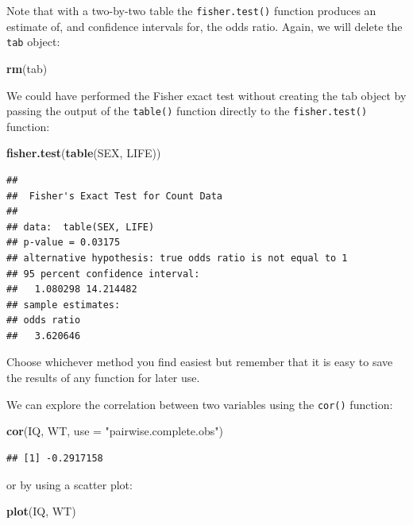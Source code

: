 \documentclass[]{book}
\newenvironment{Shaded}{\begin{snugshade}}{\end{snugshade}}
\newcommand{\KeywordTok}[1]{\textcolor[rgb]{0.13,0.29,0.53}{\textbf{#1}}}
\newcommand{\DataTypeTok}[1]{\textcolor[rgb]{0.13,0.29,0.53}{#1}}
\newcommand{\StringTok}[1]{\textcolor[rgb]{0.31,0.60,0.02}{#1}}
\newcommand{\NormalTok}[1]{#1}
\theoremstyle{definition}
\theoremstyle{definition}
\theoremstyle{definition}
\theoremstyle{remark}
\begin{document}
Note that with a two-by-two table the \texttt{fisher.test()} function
produces an estimate of, and confidence intervals for, the odds ratio.
Again, we will delete the \texttt{tab} object:

\begin{Shaded}
\begin{Highlighting}[]
\KeywordTok{rm}\NormalTok{(tab)}
\end{Highlighting}
\end{Shaded}

We could have performed the Fisher exact test without creating the tab
object by passing the output of the \texttt{table()} function directly
to the \texttt{fisher.test()} function:

\begin{Shaded}
\begin{Highlighting}[]
\KeywordTok{fisher.test}\NormalTok{(}\KeywordTok{table}\NormalTok{(SEX, LIFE))}
\end{Highlighting}
\end{Shaded}

\begin{verbatim}
## 
##  Fisher's Exact Test for Count Data
## 
## data:  table(SEX, LIFE)
## p-value = 0.03175
## alternative hypothesis: true odds ratio is not equal to 1
## 95 percent confidence interval:
##   1.080298 14.214482
## sample estimates:
## odds ratio 
##   3.620646
\end{verbatim}

Choose whichever method you find easiest but remember that it is easy to
save the results of any function for later use.

We can explore the correlation between two variables using the
\texttt{cor()} function:

\begin{Shaded}
\begin{Highlighting}[]
\KeywordTok{cor}\NormalTok{(IQ, WT, }\DataTypeTok{use =} \StringTok{"pairwise.complete.obs"}\NormalTok{)}
\end{Highlighting}
\end{Shaded}

\begin{verbatim}
## [1] -0.2917158
\end{verbatim}

or by using a scatter plot:

\begin{Shaded}
\begin{Highlighting}[]
\KeywordTok{plot}\NormalTok{(IQ, WT)}
\end{Highlighting}
\end{Shaded}
\end{document}
